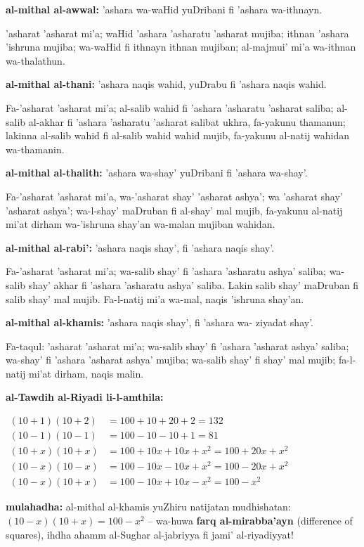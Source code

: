\documentclass[11pt,a4paper]{book}
\begin{document}
\begin{originaltext}
\textbf{al-mithal al-awwal:} 'ashara wa-waHid yuDribani fi 'ashara
wa-ithnayn.

'asharat 'asharat mi'a; waHid 'ashara 'asharatu 'asharat mujiba;
ithnan 'ashara 'ishruna mujiba; wa-waHid fi ithnayn ithnan mujiban;
al-majmui' mi'a wa-ithnan wa-thalathun.

\textbf{al-mithal al-thani:} 'ashara naqis wahid, yuDrabu fi 'ashara
naqis wahid.

Fa-'asharat 'asharat mi'a; al-salib wahid fi 'ashara 'asharatu
'asharat saliba; al-salib al-akhar fi 'ashara 'asharatu 'asharat
salibat ukhra, fa-yakunu thamanun; lakinna al-salib wahid fi
al-salib wahid wahid mujib, fa-yakunu al-natij wahidan wa-thamanin.

\textbf{al-mithal al-thalith:} 'ashara wa-shay' yuDribani fi 'ashara
wa-shay'.

Fa-'asharat 'asharat mi'a, wa-'asharat shay' 'asharat ashya'; wa
'asharat shay' 'asharat ashya'; wa-l-shay' maDruban fi al-shay'
mal mujib, fa-yakunu al-natij mi'at dirham wa-'ishruna shay'an
wa-malan mujiban wahidan.

\textbf{al-mithal al-rabi':} 'ashara naqis shay', fi 'ashara naqis
shay'.

Fa-'asharat 'asharat mi'a; wa-salib shay' fi 'ashara 'asharatu
ashya' saliba; wa-salib shay' akhar fi 'ashara 'asharatu ashya'
saliba. Lakin salib shay' maDruban fi salib shay' mal mujib.
Fa-l-natij mi'a wa-mal, naqis 'ishruna shay'an.

\textbf{al-mithal al-khamis:} 'ashara naqis shay', fi 'ashara wa-
ziyadat shay'.

Fa-taqul: 'asharat 'asharat mi'a; wa-salib shay' fi 'ashara
'asharat ashya' saliba; wa-shay' fi 'ashara 'asharat ashya'
mujiba; wa-salib shay' fi shay' mal mujib; fa-l-natij mi'at
dirham, naqis malin.
\end{originaltext}

\begin{mathexplain}
\textbf{al-Tawdih al-Riyadi li-l-amthila:}

\begin{center}
$\begin{aligned}
  (10 + 1)(10 + 2) &= 100 + 10 + 20 + 2 = 132 \\
  (10 - 1)(10 - 1) &= 100 - 10 - 10 + 1 = 81 \\
  (10 + x)(10 + x) &= 100 + 10x + 10x + x^2 = 100 + 20x + x^2 \\
  (10 - x)(10 - x) &= 100 - 10x - 10x + x^2 = 100 - 20x + x^2 \\
  (10 - x)(10 + x) &= 100 - 10x + 10x - x^2 = 100 - x^2
\end{aligned}$
\end{center}

\textbf{mulahadha:} al-mithal al-khamis yuZhiru natijatan mudhishatan:
$(10 - x)(10 + x) = 100 - x^2$ -- wa-huwa \textbf{farq al-mirabba'ayn}
(difference of squares), ihdha ahamm al-Sughar al-jabriyya fi
jami' al-riyadiyyat!
\end{mathexplain}
\end{document}
